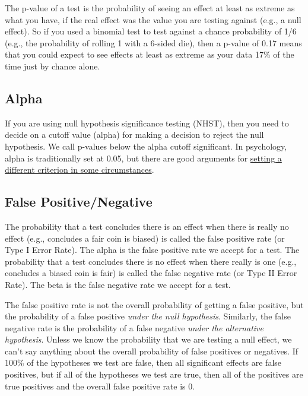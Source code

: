 \documentclass[
  oneside]{book}
\begin{document}
The p-value of a test is the probability of seeing an effect at least as extreme as what you have, if the real effect was the value you are testing against (e.g., a null effect). So if you used a binomial test to test against a chance probability of 1/6 (e.g., the probability of rolling 1 with a 6-sided die), then a p-value of 0.17 means that you could expect to see effects at least as extreme as your data 17\% of the time just by chance alone.

\hypertarget{alpha}{%
\subsection{Alpha}\label{alpha}}

If you are using null hypothesis significance testing (NHST), then you need to decide on a cutoff value (alpha) for making a decision to reject the null hypothesis. We call p-values below the alpha cutoff significant. In psychology, alpha is traditionally set at 0.05, but there are good arguments for \href{http://daniellakens.blogspot.com/2019/05/justifying-your-alpha-by-minimizing-or.html}{setting a different criterion in some circumstances}.

\hypertarget{false-pos}{%
\subsection{False Positive/Negative}\label{false-pos}}

The probability that a test concludes there is an effect when there is really no effect (e.g., concludes a fair coin is biased) is called the false positive rate (or Type I Error Rate). The alpha is the false positive rate we accept for a test. The probability that a test concludes there is no effect when there really is one (e.g., concludes a biased coin is fair) is called the false negative rate (or Type II Error Rate). The beta is the false negative rate we accept for a test.

\begin{info}
The false positive rate is not the overall probability of getting a false positive, but the probability of a false positive \emph{under the null hypothesis}. Similarly, the false negative rate is the probability of a false negative \emph{under the alternative hypothesis}. Unless we know the probability that we are testing a null effect, we can't say anything about the overall probability of false positives or negatives. If 100\% of the hypotheses we test are false, then all significant effects are false positives, but if all of the hypotheses we test are true, then all of the positives are true positives and the overall false positive rate is 0.

\end{info}
\end{document}
